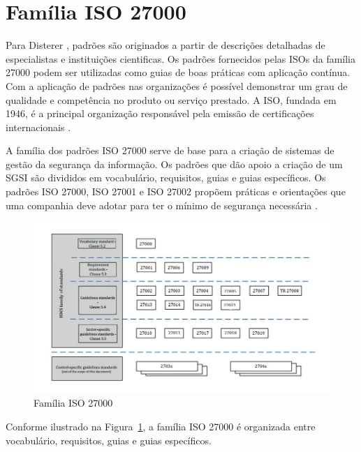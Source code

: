 \section{\label{sec:secao1}Família ISO 27000}




Para Disterer \cite{disterer2013}, padrões são originados a partir de descrições detalhadas de especialistas e instituições cientificas. Os padrões fornecidos pelas ISOs da família 27000 podem ser utilizadas como guias de boas práticas com aplicação contínua. Com a aplicação de padrões nas organizações é possível demonstrar um grau de qualidade e competência no produto ou serviço prestado. A ISO, fundada em 1946, é a principal organização responsável pela emissão de certificações internacionais \cite{disterer2013}. 




A família dos padrões ISO 27000 serve de base para a criação de sistemas de gestão da segurança da informação. Os padrões que dão apoio a criação de um SGSI  são divididos em vocabulário, requisitos, guias e guias específicos. Os padrões ISO 27000, ISO 27001 e ISO 27002 propõem práticas e orientações que uma companhia deve adotar para ter o mínimo de segurança necessária \cite{disterer2013, ISOPDF}.


\begin{figure}
    \centering
    \includegraphics[scale=0.55]{fig/ISO27000.JPG}
    \caption{Família ISO 27000 \cite{ISO27000}}
    \label{fig:testeISO}
\end{figure}


Conforme ilustrado na Figura~\ref{fig:testeISO}, a família ISO 27000 é organizada entre vocabulário, requisitos, guias e guias específicos.  



